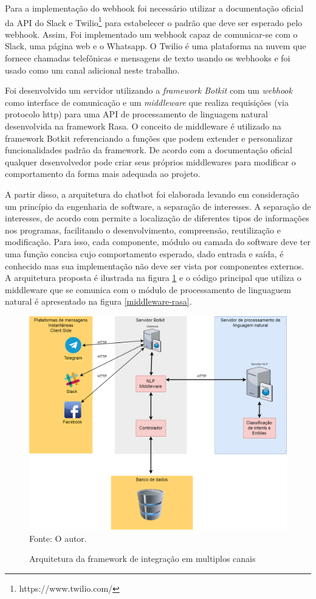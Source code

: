 Para a implementação do webhook foi necessário utilizar a documentação oficial da API do Slack e Twilio\footnote{https://www.twilio.com/} para estabelecer o padrão que deve ser esperado pelo webhook. Assim, Foi implementado um webhook capaz de comunicar-se com o Slack, uma página web e o Whatsapp. O Twilio é uma plataforma na nuvem que fornece chamadas telefônicas e mensagens de texto usando os webhooks e foi usado como um canal adicional neste trabalho.

Foi desenvolvido um servidor utilizando a \textit{framework Botkit} com um \textit{webhook} como interface de comunicação e um \textit{middleware} que realiza requisições (via protocolo http) para uma API de processamento de linguagem natural desenvolvida na framework Rasa. O conceito de middleware é utilizado na framework Botkit referenciando a funções que podem extender e personalizar funcionalidades padrão da framework. De acordo com a documentação oficial qualquer desenvolvedor pode criar seus próprios middlewares para modificar o comportamento da forma mais adequada ao projeto.

A partir disso, a arquitetura do chatbot foi elaborada levando em consideração um princípio da engenharia de software, a separação de interesses. A separação de interesses, de acordo com  permite a localização de diferentes tipos de informações nos programas, facilitando o desenvolvimento, compreensão, reutilização e modificação. Para isso, cada componente, módulo ou camada do software deve ter uma função concisa cujo comportamento esperado, dado entrada e saída, é conhecido mas sua implementação não deve ser vista por componentes externos. A arquitetura proposta é ilustrada na figura \ref{fig:arquitetura} e o código principal que utiliza o middleware que se comunica com o módulo de processamento de linguaguem natural é apresentado na figura \ref{middleware-rasa}. 


\begin{figure}[H]
  \centering
   \caption{Arquitetura da framework de integração em multiplos canais}
  \includegraphics[scale=0.35]{Imagens/Botkit-architecture.png} 
  \label{fig:arquitetura}
  Fonte: O autor.
\end{figure}




